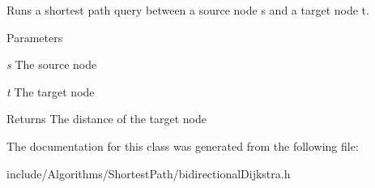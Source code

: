 Runs a shortest path query between a source node s and a target node t. 


\begin{DoxyParams}{Parameters}
\item[{\em s}]The source node \item[{\em t}]The target node \end{DoxyParams}
\begin{DoxyReturn}{Returns}
The distance of the target node 
\end{DoxyReturn}


The documentation for this class was generated from the following file:\begin{DoxyCompactItemize}
\item 
include/Algorithms/ShortestPath/bidirectionalDijkstra.h\end{DoxyCompactItemize}
